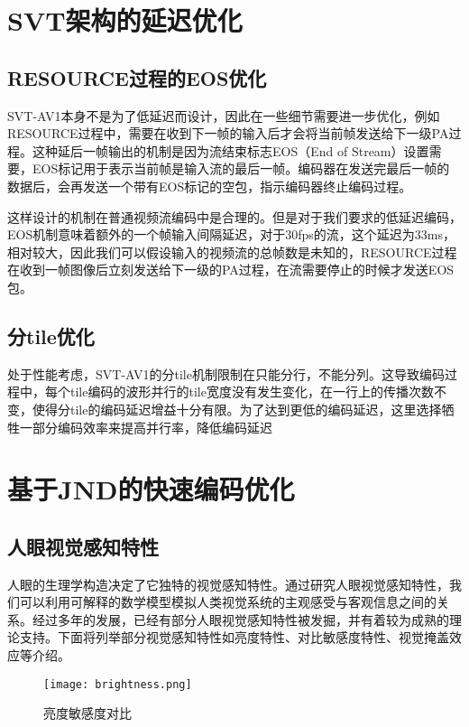\section{SVT架构的延迟优化}
\subsection{RESOURCE过程的EOS优化}
  SVT-AV1本身不是为了低延迟而设计，因此在一些细节需要进一步优化，例如RESOURCE过程中，需要在收到下一帧的输入后才会将当前帧发送给下一级PA过程。这种延后一帧输出的机制是因为流结束标志EOS（End of Stream）设置需要，EOS标记用于表示当前帧是输入流的最后一帧。编码器在发送完最后一帧的数据后，会再发送一个带有EOS标记的空包，指示编码器终止编码过程。

  这样设计的机制在普通视频流编码中是合理的。但是对于我们要求的低延迟编码，EOS机制意味着额外的一个帧输入间隔延迟，对于30fps的流，这个延迟为33ms，相对较大，因此我们可以假设输入的视频流的总帧数是未知的，RESOURCE过程在收到一帧图像后立刻发送给下一级的PA过程，在流需要停止的时候才发送EOS包。
\subsection{分tile优化}
  处于性能考虑，SVT-AV1的分tile机制限制在只能分行，不能分列。这导致编码过程中，每个tile编码的波形并行的tile宽度没有发生变化，在一行上的传播次数不变，使得分tile的编码延迟增益十分有限。为了达到更低的编码延迟，这里选择牺牲一部分编码效率来提高并行率，降低编码延迟


\section{基于JND的快速编码优化}

  \subsection{人眼视觉感知特性} \label{sec:HVS}
  人眼的生理学构造决定了它独特的视觉感知特性。通过研究人眼视觉感知特性，我们可以利用可解释的数学模型模拟人类视觉系统的主观感受与客观信息之间的关系。经过多年的发展，已经有部分人眼视觉感知特性被发掘，并有着较为成熟的理论支持。下面将列举部分视觉感知特性如亮度特性、对比敏感度特性、视觉掩盖效应等介绍。

  \begin{figure}[!htp]
    \centering
    \texttt{[image: brightness.png]}
    \caption{亮度敏感度对比}
  \label{fig:brightness}
  \end{figure}

